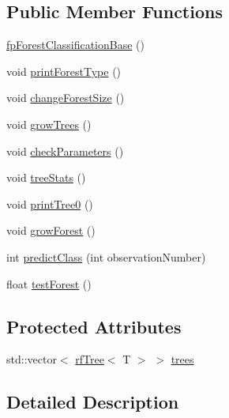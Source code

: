 \subsection*{Public Member Functions}
\begin{DoxyCompactItemize}
\item 
\hyperlink{classfp_1_1fpForestClassificationBase_a788f11473d1b7c86928d021617a92f2a}{fp\+Forest\+Classification\+Base} ()
\item 
void \hyperlink{classfp_1_1fpForestClassificationBase_a6b5243d32b468308a4f013ad5a9df2dd}{print\+Forest\+Type} ()
\item 
void \hyperlink{classfp_1_1fpForestClassificationBase_a696b361df0a1c9aa36687333e2d8111b}{change\+Forest\+Size} ()
\item 
void \hyperlink{classfp_1_1fpForestClassificationBase_aea9db2571269f0f627226aa75ec4a694}{grow\+Trees} ()
\item 
void \hyperlink{classfp_1_1fpForestClassificationBase_a3186e3b6471f82df3f69172f67aa7d19}{check\+Parameters} ()
\item 
void \hyperlink{classfp_1_1fpForestClassificationBase_a48567d379434daeccb1540c84674d286}{tree\+Stats} ()
\item 
void \hyperlink{classfp_1_1fpForestClassificationBase_a1989f90fbd27ac90232b7a1071c96a00}{print\+Tree0} ()
\item 
void \hyperlink{classfp_1_1fpForestClassificationBase_a706225fdbef8c71fb022f4c3446b388d}{grow\+Forest} ()
\item 
int \hyperlink{classfp_1_1fpForestClassificationBase_ad0c690fff971fab681467fbcd8762b5f}{predict\+Class} (int observation\+Number)
\item 
float \hyperlink{classfp_1_1fpForestClassificationBase_a3f1ad5a5cfb3633713d0a81bd1c356e8}{test\+Forest} ()
\end{DoxyCompactItemize}
\subsection*{Protected Attributes}
\begin{DoxyCompactItemize}
\item 
std\+::vector$<$ \hyperlink{classfp_1_1rfTree}{rf\+Tree}$<$ T $>$ $>$ \hyperlink{classfp_1_1fpForestClassificationBase_a51482a6c95c4b3cb42627f029c2d4662}{trees}
\end{DoxyCompactItemize}


\subsection{Detailed Description}
